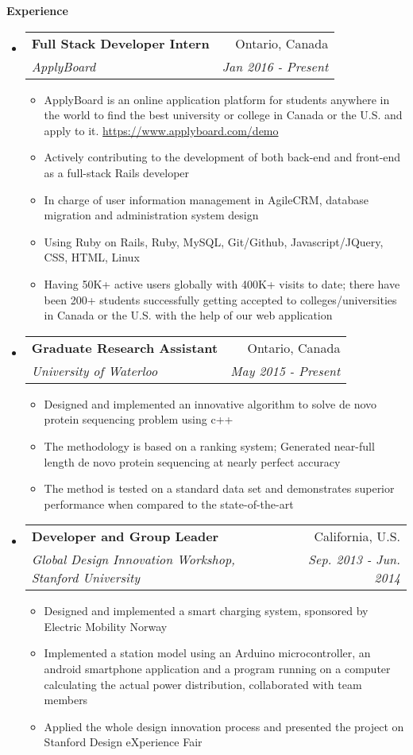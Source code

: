 \documentclass[letterpaper,10pt]{article}
\makeatletter
\newcommand{\resitem}[1]{\item #1 \vspace{-2pt}}
\newcommand{\resheading}[1]{{\large \colorbox{mygrey}{\begin{minipage}{\textwidth}{\textbf{#1 \vphantom{p\^{E}}}}\end{minipage}}}}
\newcommand{\ressubheading}[4]{
\begin{tabular*}{7.0in}{l@{\extracolsep{\fill}}r}
		\textbf{#1} & #2 \\
		\textit{#3} & \textit{#4} \\
\end{tabular*}\vspace{-6pt}}
\makeatother
\begin{document}
\resheading{Experience}
\begin{itemize}
\itemsep0em
\item 
	\ressubheading{Full Stack Developer Intern}{Ontario, Canada}{ApplyBoard}{Jan 2016 - Present}
	\begin{itemize}
		\resitem{ApplyBoard is an online application platform for students anywhere in the world to find the best university or college in Canada or the U.S. and apply to it. \url{https://www.applyboard.com/demo} }
		\resitem{Actively contributing to the development of both back-end and front-end as a full-stack Rails developer}
		\resitem{In charge of user information management in AgileCRM, database migration and administration system design}
		\resitem{Using Ruby on Rails, Ruby, MySQL, Git/Github, Javascript/JQuery, CSS, HTML, Linux}
        \resitem{Having 50K+ active users globally with 400K+ visits to date; there have been 200+ students successfully getting accepted to colleges/universities in Canada or the U.S. with the help of our web application }
	\end{itemize}

\item
	\ressubheading{Graduate Research Assistant}{Ontario, Canada}{University of Waterloo}{May 2015 - Present}
	\begin{itemize}
		\resitem{Designed and implemented an innovative algorithm to solve de novo protein sequencing problem using c++}
		\resitem{The methodology is based on a ranking system; Generated near-full length de novo protein sequencing at nearly perfect accuracy}
		\item{The method is tested on a standard data set and demonstrates superior performance when compared to the state-of-the-art}
	\end{itemize}
\item
	\ressubheading{Developer and Group Leader}{California, U.S.}{Global Design Innovation Workshop, Stanford University}{ Sep. 2013 - Jun. 2014}
	\begin{itemize}
		\resitem{Designed and implemented a smart charging system, sponsored by Electric Mobility Norway}
		\resitem {Implemented a station model using an Arduino microcontroller, an android smartphone application and a program running on a computer calculating the actual power distribution, collaborated with team members}
		\resitem{Applied the whole design innovation process and presented the project on Stanford Design eXperience Fair}
	\end{itemize}
\end{itemize}
\end{document}
